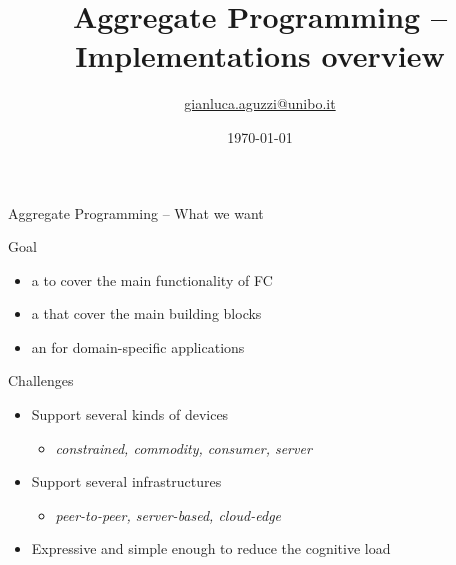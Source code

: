 \documentclass[presentation, 9pt]{beamer}\mode<presentation>{\usetheme{AMSBolognaFC}}
\title[AP -- Implementations overview]
{Aggregate Programming -- Implementations overview}
\author[\sspeaker{Aguzzi}]
{\speaker{Gianluca Aguzzi} \href{mailto:gianluca.aguzzi@unibo.it}{gianluca.aguzzi@unibo.it} }
\institute[DISI, Univ.\ Bologna]
{%
\textsc{Alma Mater Studiorum} -- Universit{\`a} di Bologna \\[0.1cm]
}
\date[\today]{\today}
\begin{document}

\frame{\titlepage}
\begin{frame}{Aggregate Programming -- What we want}
	\begin{exampleblock}{Goal}
		\begin{itemize}
			\item a  to cover the main functionality of FC
			\item a  that cover the main building blocks
			\item an  for domain-specific applications
		\end{itemize}
	\end{exampleblock}
	\begin{exampleblock}{Challenges}
		\begin{itemize}
			\item Support several kinds of devices
			\begin{itemize}
				\item \emph{constrained, commodity, consumer, server}
			\end{itemize}
			\item Support several infrastructures
			\begin{itemize}
				\item \emph{peer-to-peer, server-based, cloud-edge} 
			\end{itemize}
			\item Expressive and simple enough to reduce the cognitive load
		\end{itemize}
	\end{exampleblock}
\end{frame}
\end{document}
